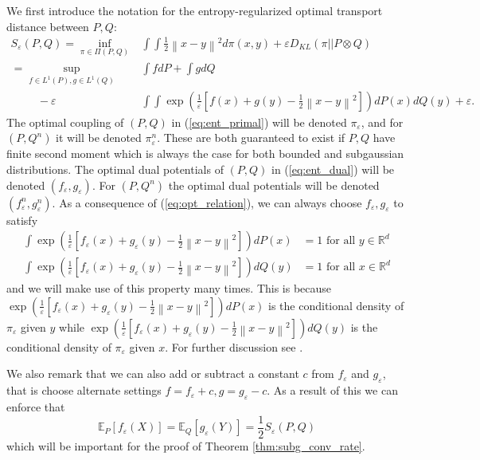 \documentclass{article}
\theoremstyle{definition}
\newcommand{\feps}{f_\varepsilon}
\newcommand{\geps}{g_\varepsilon}
\newcommand{\norm}[1]{\left\lVert#1\right\rVert}
\begin{document}
We first introduce the notation for the entropy-regularized optimal transport distance between $P,Q$:
\begin{align}
        S_\varepsilon(P,Q) = \inf_{\pi \in \Pi(P,Q)} &\int \int \frac{1}{2}\norm{x-y}^2 d\pi(x,y) + \varepsilon D_{KL}(\pi || P \otimes Q)  \label{eq:ent_primal} \\
        = \sup_{f \in L^1(P), g \in L^1(Q)} &\int f dP + \int g dQ \nonumber \\
        \hspace{1cm}- \varepsilon&\int \int \exp \left (\frac{1}{\varepsilon}\left [f(x) + g(y) - \frac{1}{2}\norm{x-y}^2 \right ]\right ) dP(x) dQ(y) + \varepsilon. \label{eq:ent_dual} 
\end{align}
The optimal coupling of $(P,Q)$ in (\ref{eq:ent_primal}) will be denoted $\pi_\varepsilon$, and for $(P,Q^n)$ it will be denoted $\pi_\varepsilon^n$. These are both guaranteed to exist if $P,Q$ have finite second moment which is always the case for both bounded and subgaussian distributions.
The optimal dual potentials of $(P,Q)$ in (\ref{eq:ent_dual}) will be denoted $(\feps,\geps)$. For $(P,Q^n)$ the optimal dual potentials will be denoted $(\feps^n,\geps^n)$. As a consequence of (\ref{eq:opt_relation}), we can always choose $\feps,\geps$ to satisfy 
\begin{align}
    \int \exp \left (\frac{1}{\varepsilon}\left [\feps(x) + \geps(y) - \frac{1}{2}\norm{x-y}^2 \right ]\right ) dP(x) &= 1 \text{ for all } y \in \mathbb{R}^d \label{eq:int_1_all_y} \\
    \int \exp \left (\frac{1}{\varepsilon}\left [\feps(x) + \geps(y) - \frac{1}{2}\norm{x-y}^2 \right ]\right ) dQ(y) &= 1 \text{ for all } x \in \mathbb{R}^d \label{eq:int_1_all_x} 
\end{align}
and we will make use of this property many times. This is because $\exp \left (\frac{1}{\varepsilon}\left [\feps(x) + \geps(y) - \frac{1}{2}\norm{x-y}^2 \right ]\right ) dP(x)$ is the conditional density of $\pi_\varepsilon$ given $y$ while $\exp \left (\frac{1}{\varepsilon}\left [\feps(x) + \geps(y) - \frac{1}{2}\norm{x-y}^2 \right ]\right ) dQ(y)$ is the conditional density of $\pi_\varepsilon$ given $x$. For further discussion see \cite{pooladian2021entropic}. 

We also remark that we can also add or subtract a constant $c$ from $\feps$ and $\geps$, that is choose alternate settings $f = \feps + c, g = \geps - c$. As a result of this we can enforce that
\begin{equation*}
    \mathbb{E}_P[\feps(X)] = \mathbb{E}_Q[\geps(Y)] = \frac{1}{2}S_\varepsilon(P,Q)
\end{equation*}
which will be important for the proof of Theorem \ref{thm:subg_conv_rate}. 
\end{document}
